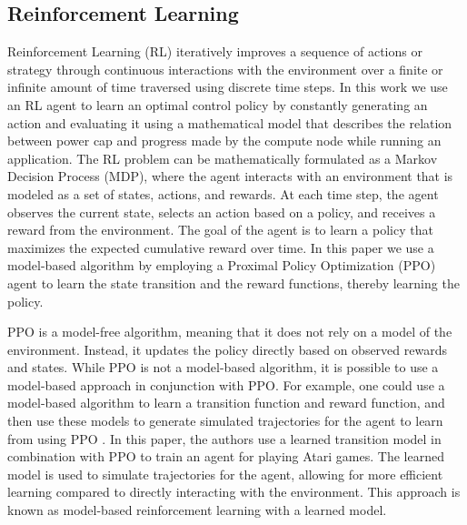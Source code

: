 \subsection{Reinforcement Learning} \label{subsec:Reinforcement_Learning}
Reinforcement Learning (RL) iteratively improves a sequence of actions or strategy through continuous interactions with the environment over a finite or infinite amount of time traversed using discrete time steps. 
In this work we use an RL agent to learn an optimal control policy by constantly generating an action and evaluating it using a mathematical model that describes the relation between power cap  and progress made by the compute node while running an application. The RL problem can be mathematically formulated as a Markov Decision Process (MDP), where the agent interacts with an environment that is modeled as a set of states, actions, and rewards. 
At each time step, the agent observes the current state, selects an action based on a policy, and receives a reward from the environment. The goal of the agent is to learn a policy that maximizes the expected cumulative reward over time. 
In this paper we use a model-based algorithm by employing a Proximal Policy Optimization (PPO)~\cite{schulman2017proximal} agent to learn the state transition and the reward functions, thereby learning the policy.

\iffalse
PPO is a model-free algorithm, meaning that it does not rely on a model of the environment. Instead, it updates the policy directly based on observed rewards and states. While PPO is not a model-based algorithm, it is possible to use a model-based approach in conjunction with PPO. For example, one could use a model-based algorithm to learn a transition function and reward function, and then use these models to generate simulated trajectories for the agent to learn from using PPO \cite{https://doi.org/10.48550/arxiv.1903.00374}. In this paper, the authors use a learned transition model in combination with PPO to train an agent for playing Atari games. The learned model is used to simulate trajectories for the agent, allowing for more efficient learning compared to directly interacting with the environment. This approach is known as model-based reinforcement learning with a learned model. 

